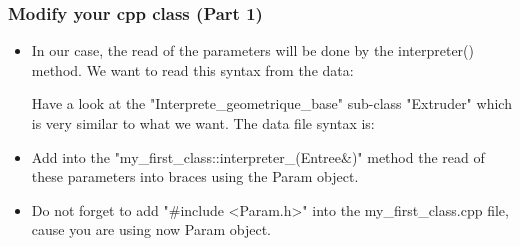 \documentclass[10pt, hyperref={unicode=true,pdfusetitle, bookmarks=true,bookmarksnumbered=false,bookmarksopen=false, breaklinks=false,pdfborder={0 0 1},backref=true,colorlinks=true,linkcolor=darkblue,pageanchor, urlcolor=darkblue}]{beamer}
\begin{document}
\begin{frame}
\frametitle{Modify your cpp class (Part 1)}
\begin{block}{}

\begin{itemize}

\item In our case, the read of the parameters will be done by the interpreter() method. We want to read this syntax from the data:
\begin{center}
\end{center}

 Have a look at the "Interprete\_geometrique\_base" sub-class "Extruder" which is very similar to what we want. The data file syntax is:
\begin{center}
\end{center}
\item Add into the "my\_first\_class::interpreter\_(Entree\&)" method the read of these parameters into braces using the Param object.
\item Do not forget to add "\#include <Param.h>" into the my\_first\_class.cpp file, cause you are using now Param object.

\end{itemize}

\end{block}
\end{frame}
\end{document}
